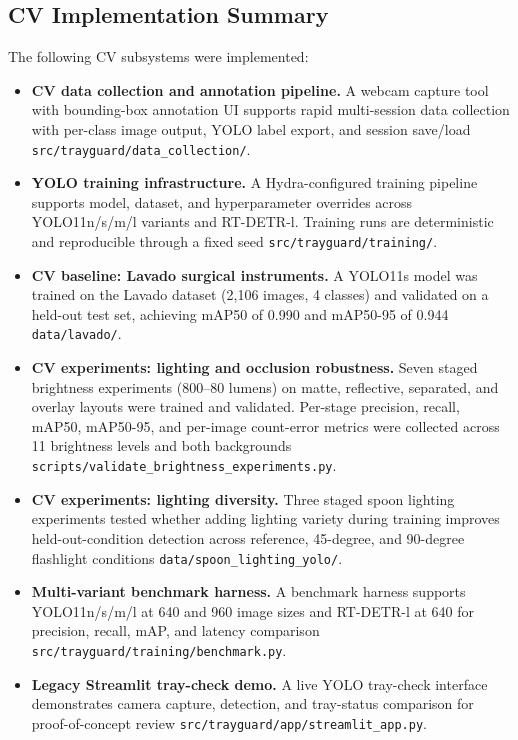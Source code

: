 \documentclass[10pt,a4paper]{article}
\begin{document}
\subsection{CV Implementation Summary}

The following CV subsystems were implemented:

\begin{itemize}
   \item \textbf{CV data collection and annotation pipeline.} A webcam capture tool with bounding-box annotation UI supports rapid multi-session data collection with per-class image output, YOLO label export, and session save/load \texttt{src/trayguard/data\_collection/}.
   \item \textbf{YOLO training infrastructure.} A Hydra-configured training pipeline supports model, dataset, and hyperparameter overrides across YOLO11n/s/m/l variants and RT-DETR-l. Training runs are deterministic and reproducible through a fixed seed \texttt{src/trayguard/training/}.
   \item \textbf{CV baseline: Lavado surgical instruments.} A YOLO11s model was trained on the Lavado dataset (2,106 images, 4 classes) and validated on a held-out test set, achieving mAP50 of 0.990 and mAP50-95 of 0.944 \texttt{data/lavado/}.
   \item \textbf{CV experiments: lighting and occlusion robustness.} Seven staged brightness experiments (800--80 lumens) on matte, reflective, separated, and overlay layouts were trained and validated. Per-stage precision, recall, mAP50, mAP50-95, and per-image count-error metrics were collected across 11 brightness levels and both backgrounds \texttt{scripts/validate\_brightness\_experiments.py}.
   \item \textbf{CV experiments: lighting diversity.} Three staged spoon lighting experiments tested whether adding lighting variety during training improves held-out-condition detection across reference, 45-degree, and 90-degree flashlight conditions \texttt{data/spoon\_lighting\_yolo/}.
   \item \textbf{Multi-variant benchmark harness.} A benchmark harness supports YOLO11n/s/m/l at 640 and 960 image sizes and RT-DETR-l at 640 for precision, recall, mAP, and latency comparison \texttt{src/trayguard/training/benchmark.py}.
   \item \textbf{Legacy Streamlit tray-check demo.} A live YOLO tray-check interface demonstrates camera capture, detection, and tray-status comparison for proof-of-concept review \texttt{src/trayguard/app/streamlit\_app.py}.
\end{itemize}
\end{document}
